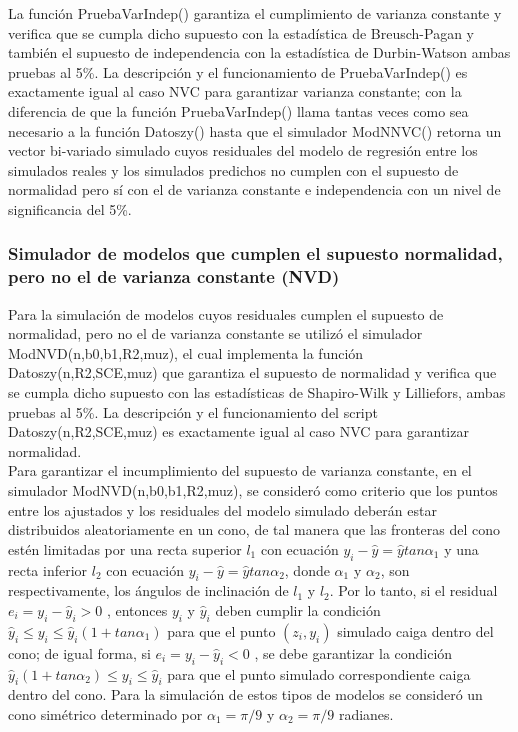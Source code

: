 La función PruebaVarIndep() garantiza el cumplimiento de varianza constante y verifica que se cumpla dicho supuesto con la estadística de Breusch-Pagan y también el supuesto de independencia con la estadística de Durbin-Watson ambas pruebas al 5\%. La descripción y el funcionamiento de PruebaVarIndep() es exactamente igual al caso NVC para garantizar varianza constante; con la diferencia de que la función PruebaVarIndep() llama tantas veces como sea necesario a la función Datoszy() hasta que el simulador ModNNVC()  retorna un vector bi-variado simulado cuyos residuales del modelo de regresión entre los simulados reales y los simulados predichos no cumplen con el supuesto de normalidad pero sí con el de varianza constante e independencia con un nivel de significancia del 5\%.\\ 

\subsubsection{Simulador de modelos que cumplen el supuesto normalidad, pero no el de varianza constante (NVD)}

Para la simulación de modelos cuyos residuales cumplen el supuesto de normalidad, pero no el de varianza constante se utilizó el simulador ModNVD(n,b0,b1,R2,muz), el cual implementa la función Datoszy(n,R2,SCE,muz) que garantiza el supuesto de normalidad y verifica que se cumpla dicho supuesto con las estadísticas de Shapiro-Wilk y Lilliefors, ambas pruebas al 5\%. La descripción y el funcionamiento del script Datoszy(n,R2,SCE,muz) es exactamente igual al caso NVC para garantizar normalidad.\\


Para garantizar el incumplimiento del supuesto de varianza constante, en el simulador ModNVD(n,b0,b1,R2,muz), se consideró como criterio que los puntos entre los ajustados y los residuales del modelo simulado deberán estar distribuidos aleatoriamente en un cono, de tal manera que las fronteras del cono estén limitadas por una recta superior $l_1$ con ecuación $y_i-\hat{y}=\hat{y}tan \alpha_1$ y una recta inferior $l_2$ con ecuación $y_i-\hat{y}=\hat{y}tan \alpha_2$, donde  $\alpha_1$ y $\alpha_2$, son respectivamente, los ángulos de inclinación de $l_1$ y $l_2$. Por lo tanto, si el residual $e_i=y_i - \hat{y}_i > 0$ , entonces $y_i$ y $\hat{y}_i$ deben cumplir la condición $\hat{y}_i \leq y_i \leq \hat{y}_i (1+tan \alpha_1)$ para que el punto $(z_i,y_i)$ simulado caiga dentro del cono; de igual forma, si $e_i=y_i - \hat{y}_i < 0$ , se debe garantizar la condición $\hat{y}_i (1+tan \alpha_2) \leq y_i \leq \hat{y}_i $ para que el punto simulado correspondiente caiga dentro del cono. Para la simulación de estos tipos de modelos se consideró un cono simétrico determinado por $\alpha_1=\pi / 9$ y $\alpha_2=\pi/9$ radianes. \\


